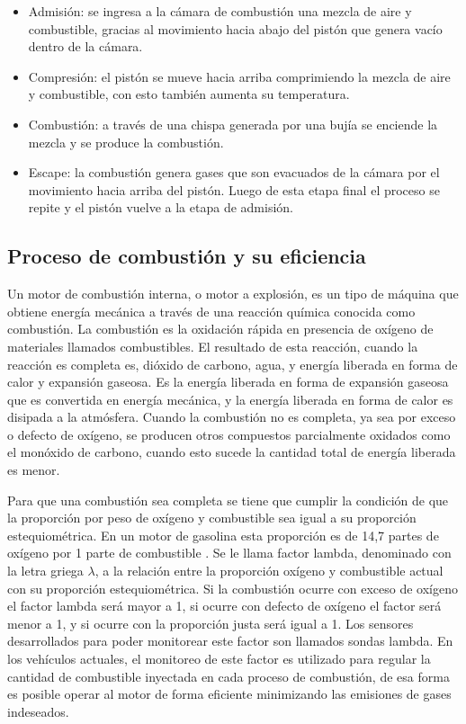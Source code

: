 \begin{itemize}
\item{Admisión:} se ingresa a la cámara de combustión una mezcla de aire y combustible, gracias al movimiento hacia abajo del pistón que genera vacío dentro de la cámara.
\item{Compresión:} el pistón se mueve hacia arriba comprimiendo la mezcla de aire y combustible, con esto también aumenta su temperatura.
\item{Combustión:} a través de una chispa generada por una bujía se enciende la mezcla y se produce la combustión.
\item{Escape:} la combustión genera gases que son evacuados de la cámara por el movimiento hacia arriba del pistón. Luego de esta etapa final el proceso se repite y el pistón vuelve a la etapa de admisión.
\end{itemize}

\subsection{Proceso de combustión y su eficiencia}

Un motor de combustión interna, o motor a explosión, es un tipo de máquina que obtiene energía mecánica a través de una reacción química conocida como combustión. La combustión es la oxidación rápida en presencia de oxígeno de materiales llamados combustibles. El resultado de esta reacción, cuando la reacción es completa es, dióxido de carbono, agua, y energía liberada en forma de calor y expansión gaseosa. Es la energía liberada en forma de expansión gaseosa que es convertida en energía mecánica, y la energía liberada en forma de calor es disipada a la atmósfera. Cuando la combustión no es completa, ya sea por exceso o defecto de oxígeno, se producen otros compuestos parcialmente oxidados como el monóxido de carbono, cuando esto sucede la cantidad total de energía liberada es menor.

Para que una combustión sea completa se tiene que cumplir la condición de que la proporción por peso de oxígeno y combustible sea igual a su proporción estequiométrica. En un motor de gasolina esta proporción es de 14,7 partes de oxígeno por 1 parte de combustible \citep{book-afr}. Se le llama factor lambda, denominado con la letra griega $\lambda$, a la relación entre la proporción oxígeno y combustible actual con su proporción estequiométrica. Si la combustión ocurre con exceso de oxígeno el factor lambda será mayor a 1, si ocurre con defecto de oxígeno el factor será menor a 1, y si ocurre con la proporción justa será igual a 1. Los sensores desarrollados para poder monitorear este factor son llamados sondas lambda. En los vehículos actuales, el monitoreo de este factor es utilizado para regular la cantidad de combustible inyectada en cada proceso de combustión, de esa forma es posible operar al motor de forma eficiente minimizando las emisiones de gases indeseados.

